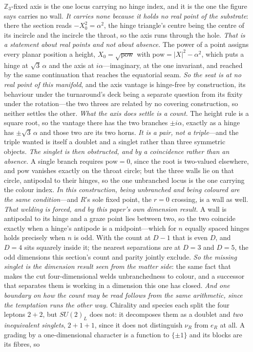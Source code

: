 \documentclass[11pt]{article}
\begin{document}
$\mathbb{Z}_{3}$-fixed axis is the one locus carrying no hinge index, and it is the one the figure says carries no wall. \emph{It carries none because it holds no real point of the substrate}: there the section reads $-X_{0}^{2}=\alpha^{2}$, the hinge triangle's centre being the centre of its incircle and the incircle the throat, so the axis runs through the hole. \emph{That is a statement about real points and not about absence.} The power of a point assigns every planar position a height, $X_{0}=\sqrt{\mathrm{pow}}$ with $\mathrm{pow}=|X|^{2}-\alpha^{2}$, which puts a hinge at $\sqrt{3}\,\alpha$ and the axis at $i\alpha$---imaginary, at the one invariant, and reached by the same continuation that reaches the equatorial seam. \emph{So the seat is at no real point of this manifold}, and the axis vantage is hinge-free by construction, its behaviour under the turnaround's deck being a separate question from its fixity under the rotation---the two threes are related by no covering construction, so neither settles the other. \emph{What the axis does settle is a count.} The height rule is a square root, so the vantage there has the two branches $\pm i\alpha$, exactly as a hinge has $\pm\sqrt{3}\,\alpha$ and those two are its two horns. \emph{It is a pair, not a triple}---and the triple wanted is itself a doublet and a singlet rather than three symmetric objects. \emph{The singlet is then obstructed, and by a coincidence rather than an absence.} A single branch requires $\mathrm{pow}=0$, since the root is two-valued elsewhere, and $\mathrm{pow}$ vanishes exactly on the throat circle; but the three walls lie on that circle, antipodal to their hinges, so the one unbranched locus is the one carrying the colour index. \emph{In this construction, being unbranched and being coloured are the same condition}---and $R$'s sole fixed point, the $r=0$ crossing, is a wall as well. \emph{That welding is forced, and by this paper's own dimension result.} A wall is antipodal to its hinge and a graze point lies between two, so the two coincide exactly when a hinge's antipode is a midpoint---which for $n$ equally spaced hinges holds precisely when $n$ is odd. With the count at $D-1$ that is even $D$, and $D=4$ sits squarely inside it; the nearest separations are at $D=3$ and $D=5$, the odd dimensions this section's count and parity jointly exclude. \emph{So the missing singlet is the dimension result seen from the matter side}: the same fact that makes the cut four-dimensional welds unbranchedness to colour, and a successor that separates them is working in a dimension this one has closed. \emph{And one boundary on how the count may be read follows from the same arithmetic, since the temptation runs the other way.} Chirality and species each split the four leptons $2+2$, but $SU(2)_L$ does not: it decomposes them as a doublet and \emph{two inequivalent singlets}, $2+1+1$, since it does not distinguish $\nu_R$ from $e_R$ at all. A grading by a one-dimensional character is a function to $\{\pm1\}$ and its blocks are its fibres, so 
\end{document}
